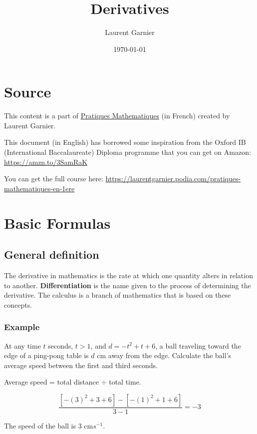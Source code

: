 \documentclass[11pt]{article}
\author{Laurent Garnier}
\date{\today}
\title{Derivatives}
\begin{document}
\maketitle
\tableofcontents


\section{Source}
\label{sec:org3c243fb}

This content is a part of \href{https://laurentgarnier.podia.com/pratiques-mathematiques-en-1ere}{Pratiques Mathematiques} (in French)
created by Laurent Garnier.

This document (in English) has borrowed some inspiration from the
Oxford IB (International Baccalaureate) Diploma programme that you
can get on Amazon: \url{https://amzn.to/3SamRaK}

You can get the full course here:
\url{https://laurentgarnier.podia.com/pratiques-mathematiques-en-1ere}


\section{Basic Formulas}
\label{sec:org3c45c4c}
\subsection{General definition}
\label{sec:org72ab43d}

The derivative in mathematics is the rate at which one quantity
alters in relation to another. \textbf{Differentiation} is the name given to
the process of determining the derivative. The calculus is a branch
of mathematics that is based on these concepts.

\subsubsection{Example}
\label{sec:orgbb97393}

At any time \(t\) seconds, \(t > 1\), and \(d = -t^2 + t + 6\), a ball
traveling toward the edge of a ping-pong table is \(d\) cm away from
the edge. Calculate the ball's average speed between the first and
third seconds.

Average speed = total distance \(\div\) total time.

\[\dfrac{\left[-(3)^2 + 3 + 6\right]-\left[-(1)^2+1+6\right]}{3-1}
    = -3\]

The speed of the ball is 3 cm\(s^{-1}\).
\end{document}
